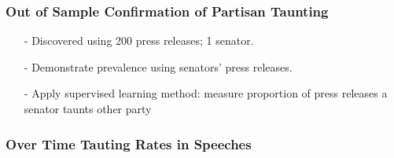\documentclass{beamer}
\numberwithin{equation}{section}
\begin{document}
\begin{frame}
\frametitle{Out of Sample Confirmation of Partisan Taunting}
\begin{itemize}
\item[-] Discovered using 200 press releases; 1 senator.
\item[-] Demonstrate prevalence using senators' press releases.
\item[-] Apply supervised learning method: measure \alert{proportion of press releases} a senator
taunts other party
\end{itemize}
 \pause
{}
\end{frame}

\begin{frame}
\frametitle{Over Time Tauting Rates in Speeches}

\begin{figure}[hbt!]
      \begin{center}
      \end{center}
     \end{figure}

 \end{frame}
\end{document}
